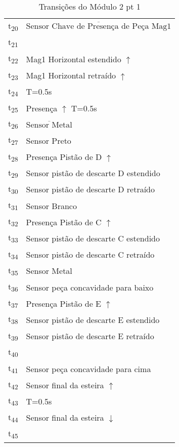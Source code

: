 \begin{table}[htbp]
\caption{Transições do Módulo 2 pt 1}
\centering
\begin{tabular}{ll}
t\textsubscript{20} & \(\overline{\mbox{Sensor Chave de Presença de Peça Mag1}}\)\\
t\textsubscript{21} & \\
t\textsubscript{22} & Mag1 Horizontal estendido \(\uparrow\)\\
t\textsubscript{23} & Mag1 Horizontal retraído \(\uparrow\)\\
t\textsubscript{24} & T=0.5s\\
t\textsubscript{25} & Presença \(\uparrow\) T=0.5s\\
t\textsubscript{26} & \(\overline{\mbox{Sensor Metal}}\)\\
t\textsubscript{27} & Sensor Preto\\
t\textsubscript{28} & Presença Pistão de D \(\uparrow\)\\
t\textsubscript{29} & Sensor pistão de descarte D estendido\\
t\textsubscript{30} & Sensor pistão de descarte D retraído\\
t\textsubscript{31} & Sensor Branco\\
t\textsubscript{32} & Presença Pistão de C \(\uparrow\)\\
t\textsubscript{33} & Sensor pistão de descarte C estendido\\
t\textsubscript{34} & Sensor pistão de descarte C retraído\\
t\textsubscript{35} & Sensor Metal\\
t\textsubscript{36} & Sensor peça concavidade para baixo\\
t\textsubscript{37} & Presença Pistão de E \(\uparrow\)\\
t\textsubscript{38} & Sensor pistão de descarte E estendido\\
t\textsubscript{39} & Sensor pistão de descarte E retraído\\
t\textsubscript{40} & \\
t\textsubscript{41} & Sensor peça concavidade para cima\\
t\textsubscript{42} & Sensor final da esteira \(\uparrow\)\\
t\textsubscript{43} & T=0.5s\\
t\textsubscript{44} & Sensor final da esteira \(\downarrow\)\\
t\textsubscript{45} & \\
\end{tabular}
\end{table}
